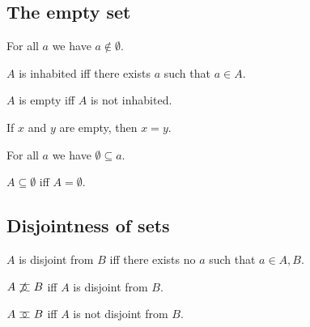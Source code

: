 \subsection{The empty set}

\begin{axiom}%
\label{notin_emptyset}
    For all $a$ we have $a\notin\emptyset$.
\end{axiom}

\begin{definition}\label{inhabited}
    $A$ is inhabited iff
    there exists $a$ such that $a\in A$.
\end{definition}

\begin{abbreviation}\label{empty}
    $A$ is empty iff $A$ is not inhabited.
\end{abbreviation}


\begin{proposition}%
\label{empty_eq}
    If $x$ and $y$ are empty, then $x = y$.
\end{proposition}

\begin{proposition}\label{emptyset_subseteq}
    For all $a$ we have $\emptyset \subseteq a$.
\end{proposition}

\begin{proposition}%
\label{subseteq_emptyset_iff}
    $A\subseteq \emptyset$ iff $A = \emptyset$.
\end{proposition}


\subsection{Disjointness of sets}

\begin{definition}\label{disjoint}
    $A$ is disjoint from $B$ iff there exists no $a$ such that $a\in A, B$.
\end{definition}

\begin{abbreviation}\label{notmeets}
    $A\mathrel{\not\mathrel{\supset\!\!\!\subset}} B$ iff $A$ is disjoint from $B$.
\end{abbreviation}

\begin{abbreviation}\label{meets}
    $A\mathrel{\supset\!\!\!\subset} B$ iff $A$ is not disjoint from $B$.
\end{abbreviation}

